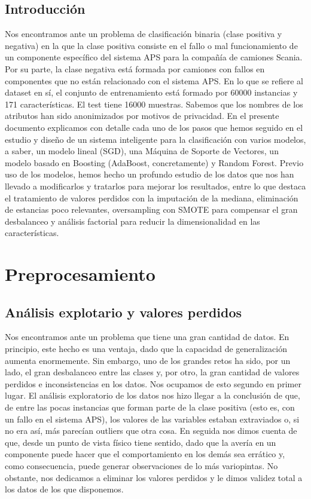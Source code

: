 \subsection{Introducción}

Nos encontramos ante un problema de clasificación binaria (clase positiva y negativa) en la que la clase positiva consiste en el fallo o mal funcionamiento de un componente específico del sistema APS para la compañía de camiones Scania. Por su parte, la clase negativa está formada por camiones con fallos en componentes que no están relacionado con el sistema APS. En lo que se refiere al dataset en sí, el conjunto de entrenamiento está formado por 60000 instancias y 171 características. El test tiene 16000 muestras. Sabemos que los nombres de los atributos han sido anonimizados por motivos de privacidad. En el presente documento explicamos con detalle cada uno de los pasos que hemos seguido en el estudio y diseño de un sistema inteligente para la clasificación con varios modelos, a saber, un modelo lineal (SGD), una Máquina de Soporte de Vectores, un modelo basado en Boosting (AdaBoost, concretamente) y Random Forest. Previo uso de los modelos, hemos hecho un profundo estudio de los datos que nos han llevado a modificarlos y tratarlos para mejorar los resultados, entre lo que destaca el tratamiento de valores perdidos con la imputación de la mediana, eliminación de estancias poco relevantes, oversampling con SMOTE para compensar el gran desbalanceo y análisis factorial para reducir la dimensionalidad en las características. 

\section{Preprocesamiento}

\subsection{Análisis explotario y valores perdidos}

Nos encontramos ante un problema que tiene una gran cantidad de datos. En principio, este hecho es una ventaja, dado que la capacidad de generalización aumenta enormemente. Sin embargo, uno de los grandes retos ha sido, por un lado, el gran desbalanceo entre las clases y, por otro, la gran cantidad de valores perdidos e inconsistencias en los datos. Nos ocupamos de esto segundo en primer lugar. El análisis exploratorio de los datos nos hizo llegar a la conclusión de que, de entre las pocas instancias que forman parte de la clase positiva (esto es, con un fallo en el sistema APS), los valores de las variables estaban extraviados o, si no era así, más parecían outliers que otra cosa. En seguida nos dimos cuenta de que, desde un punto de vista físico tiene sentido, dado que la avería en un componente puede hacer que el comportamiento en los demás sea errático y, como consecuencia, puede generar observaciones de lo más variopintas. No obstante, nos dedicamos a eliminar los valores perdidos y le dimos validez total a los datos de los que disponemos. \\

